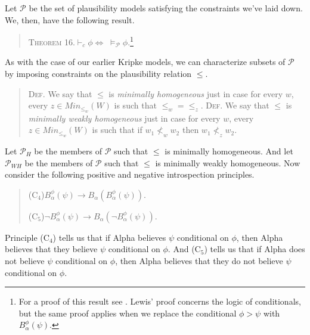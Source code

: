 Let $\mathcal{P}$ be the set of plausibility models satisfying the constraints we've laid down.
We, then, have the following result.
\begin{quote}
\textsc{Theorem 16.}\quad $\vdash_{c} \phi \Leftrightarrow \; \models_{\mathcal{P}} \phi$.\footnote{For a proof of this result see \citet{Lewis8}. Lewis' proof concerns the logic of conditionals, but the same proof applies when we replace the conditional $\phi > \psi$ with $B_\alpha^\phi(\psi)$.}
\end{quote}

As with the case of our earlier Kripke models, we can characterize subsets of $\mathcal{P}$ by imposing constraints on the plausibility relation $\leq$.
\begin{quote}
\textsc{Def.}\; We say that $\leq$ is \textit{minimally homogeneous} just in case for every $w$, every $z \in Min_{\leq_w}(W)$ is such that $\leq_w = \leq_z$.
\textsc{Def.}\; We say that $\leq$ is \textit{minimally weakly homogeneous} just in case for every $w$, every $z \in Min_{\leq_w}(W)$ is such that if $w_1 \not <_w w_2$ then $w_1 \not <_z w_2$.
\end{quote}

Let $\mathcal{P}_H$ be the members of $\mathcal{P}$ such that $\leq$ is minimally homogeneous.
And let $\mathcal{P}_{WH}$ be the members of $\mathcal{P}$ such that $\leq$ is minimally weakly homogeneous.
Now consider the following positive and negative introspection principles.
\begin{quote}
(C$_4$)\quad $B_\alpha^\phi(\psi) \rightarrow B_\alpha(B_\alpha^\phi(\psi))$.

(C$_5$)\quad $\lnot B_\alpha^\phi(\psi) \rightarrow B_\alpha(\lnot B_\alpha^\phi(\psi))$.
\end{quote}
Principle (C$_4$) tells us that if Alpha believes $\psi$ conditional on $\phi$, then Alpha believes that they believe $\psi$ conditional on $\phi$.
And (C$_5$) tells us that if Alpha does not believe $\psi$ conditional on $\phi$, then Alpha believes that they do not believe $\psi$ conditional on $\phi$.

